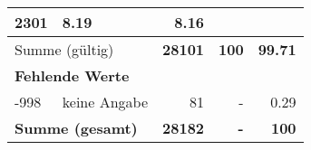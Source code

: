 \begin{longtable}{lXrrr}
       \num{2301} &
       \num[round-mode=places,round-precision=2]{8.19} &
         \num[round-mode=places,round-precision=2]{8.16} \\
     \midrule
     \multicolumn{2}{l}{Summe (gültig)} &
       \textbf{\num{28101}} &
     \textbf{\num{100}} &
       \textbf{\num[round-mode=places,round-precision=2]{99.71}} \\
     \multicolumn{5}{l}{\textbf{Fehlende Werte}}\\
       -998 &
       keine Angabe &
         \num{81} &
        - &
         \num[round-mode=places,round-precision=2]{0.29} \\
     \midrule
     \multicolumn{2}{l}{\textbf{Summe (gesamt)}} &
          \textbf{\num{28182}} &
        \textbf{-} &
        \textbf{\num{100}} \\
     \bottomrule
     \end{longtable}
     
